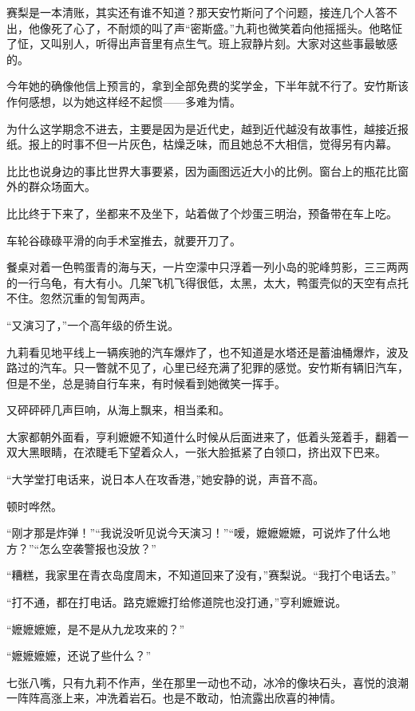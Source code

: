 \par 赛梨是一本清账，其实还有谁不知道？那天安竹斯问了个问题，接连几个人答不出，他像死了心了，不耐烦的叫了声“密斯盛。”九莉也微笑着向他摇摇头。他略怔了怔，又叫别人，听得出声音里有点生气。班上寂静片刻。大家对这些事最敏感的。
\par 今年她的确像他信上预言的，拿到全部免费的奖学金，下半年就不行了。安竹斯该作何感想，以为她这样经不起惯——多难为情。
\par 为什么这学期念不进去，主要是因为是近代史，越到近代越没有故事性，越接近报纸。报上的时事不但一片灰色，枯燥乏味，而且她总不大相信，觉得另有内幕。
\par 比比也说身边的事比世界大事要紧，因为画图远近大小的比例。窗台上的瓶花比窗外的群众场面大。
\par 比比终于下来了，坐都来不及坐下，站着做了个炒蛋三明治，预备带在车上吃。
\par 车轮谷碌碌平滑的向手术室推去，就要开刀了。
\par 餐桌对着一色鸭蛋青的海与天，一片空濛中只浮着一列小岛的驼峰剪影，三三两两的一行乌龟，有大有小。几架飞机飞得很低，太黑，太大，鸭蛋壳似的天空有点托不住。忽然沉重的訇訇两声。
\par “又演习了，”一个高年级的侨生说。
\par 九莉看见地平线上一辆疾驰的汽车爆炸了，也不知道是水塔还是蓄油桶爆炸，波及路过的汽车。只一瞥就不见了，心里已经充满了犯罪的感觉。安竹斯有辆旧汽车，但是不坐，总是骑自行车来，有时候看到她微笑一挥手。
\par 又砰砰砰几声巨响，从海上飘来，相当柔和。
\par 大家都朝外面看，亨利嬷嬷不知道什么时候从后面进来了，低着头笼着手，翻着一双大黑眼睛，在浓睫毛下望着众人，一张大脸抵紧了白领口，挤出双下巴来。
\par “大学堂打电话来，说日本人在攻香港，”她安静的说，声音不高。
\par 顿时哗然。
\par “刚才那是炸弹！”“我说没听见说今天演习！”“嗳，嬷嬷嬷嬷，可说炸了什么地方？”“怎么空袭警报也没放？”
\par “糟糕，我家里在青衣岛度周末，不知道回来了没有，”赛梨说。“我打个电话去。”
\par “打不通，都在打电话。路克嬷嬷打给修道院也没打通，”亨利嬷嬷说。
\par “嬷嬷嬷嬷，是不是从九龙攻来的？”
\par “嬷嬷嬷嬷，还说了些什么？”
\par 七张八嘴，只有九莉不作声，坐在那里一动也不动，冰冷的像块石头，喜悦的浪潮一阵阵高涨上来，冲洗着岩石。也是不敢动，怕流露出欣喜的神情。
